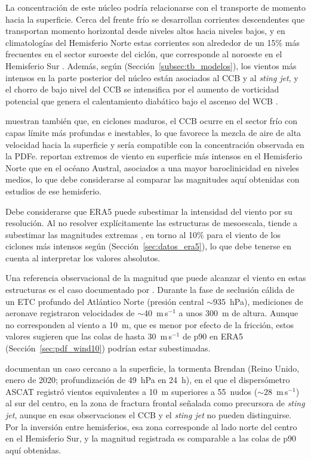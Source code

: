 La concentración de este núcleo podría relacionarse con el transporte de momento hacia la superficie. Cerca del frente frío se desarrollan corrientes descendentes que transportan momento horizontal desde niveles altos hacia niveles bajos, y en climatologías del Hemisferio Norte estas corrientes son alrededor de un 15\% más frecuentes en el sector suroeste del ciclón, que corresponde al noroeste en el Hemisferio Sur \citep{hyeok2024extrem}. Además, según \citet{martinez2014cold} (Sección~\ref{subsec:tb_modelos}), los vientos más intensos en la parte posterior del núcleo están asociados al CCB y al \textit{sting jet}, y el chorro de bajo nivel del CCB se intensifica por el aumento de vorticidad potencial que genera el calentamiento diabático bajo el ascenso del WCB \citep{schemm2014linkage}.

\citet{gentile2023observed} muestran también que, en ciclones maduros, el CCB ocurre en el sector frío con capas límite más profundas e inestables, lo que favorece la mezcla de aire de alta velocidad hacia la superficie y sería compatible con la concentración observada en la PDFe. \citet{stankovic2025surface} reportan extremos de viento en superficie más intensos en el Hemisferio Norte que en el océano Austral, asociados a una mayor baroclinicidad en niveles medios, lo que debe considerarse al comparar las magnitudes aquí obtenidas con estudios de ese hemisferio.

Debe considerarse que ERA5 puede subestimar la intensidad del viento por su resolución. Al no resolver explícitamente las estructuras de mesoescala, tiende a subestimar las magnitudes extremas \citep{hodges2011comparison}, en torno al 10\% para el viento de los ciclones más intensos según \citet{chen2024evaluation} (Sección~\ref{sec:datos_era5}), lo que debe tenerse en cuenta al interpretar los valores absolutos.

Una referencia observacional de la magnitud que puede alcanzar el viento en estas estructuras es el caso documentado por \citet{shapiro1990life}. Durante la fase de seclusión cálida de un ETC profundo del Atlántico Norte (presión central ${\sim}935$~hPa), mediciones de aeronave registraron velocidades de ${\sim}$40~m\,s$^{-1}$ a unos 300~m de altura. Aunque no corresponden al viento a 10~m, que es menor por efecto de la fricción, estos valores sugieren que las colas de hasta 30~m\,s$^{-1}$ de p90 en ERA5 (Sección~\ref{sec:pdf_wind10}) podrían estar subestimadas.

\citet{gray2020prototype} documentan un caso cercano a la superficie, la tormenta Brendan (Reino Unido, enero de 2020; profundización de 49~hPa en 24~h), en el que el dispersómetro ASCAT registró vientos equivalentes a 10~m superiores a 55~nudos (${\sim}28$~m\,s$^{-1}$) al sur del centro, en la zona de fractura frontal señalada como precursora de \textit{sting jet}, aunque en esas observaciones el CCB y el \textit{sting jet} no pueden distinguirse. Por la inversión entre hemisferios, esa zona corresponde al lado norte del centro en el Hemisferio Sur, y la magnitud registrada es comparable a las colas de p90 aquí obtenidas.

